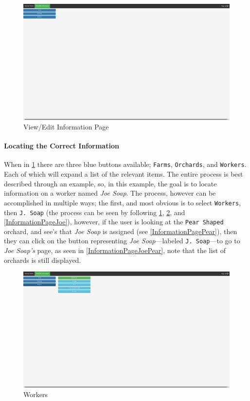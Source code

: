 \documentclass[a4paper,10pt,titlepage]{article}
\begin{document}
\begin{figure}
 \centering
 \includegraphics[width=12cm, keepaspectratio]{Images/Information-Page.png}
 \caption{View/Edit Information Page}
 \label{InformationPage}
\end{figure}

\paragraph{Locating the Correct Information}When in \ref{InformationPage} there are three blue buttons available; \texttt{Farms}, \texttt{Orchards}, and \texttt{Workers}. Each of which will expand a list of the relevant items. The entire process is best described through an example, so, in this example, the goal is to locate information on a worker named \textit{Joe Soap}. The process, however can be accomplished in multiple ways; the first, and most obvious is to select \texttt{Workers}, then \texttt{J. Soap} (the process can be seen by following \ref{InformationPage}, \ref{InformationPageWorkers}, and \ref{InformationPageJoe}), however, if the user is looking at the \texttt{Pear Shaped} orchard, and see's that \textit{Joe Soap} is assigned (see \ref{InformationPagePear}), then they can click on the button representing \textit{Joe Soap}---labeled \texttt{J. Soap}---to go to \textit{Joe Soap's} page, as seen in \ref{InformationPageJoePear}, note that the list of orchards is still displayed.

\begin{figure}
 \centering
 \includegraphics[width=12cm, keepaspectratio]{Images/Information-Workers.png}
 \caption{Workers}
 \label{InformationPageWorkers}
\end{figure}
\end{document}
